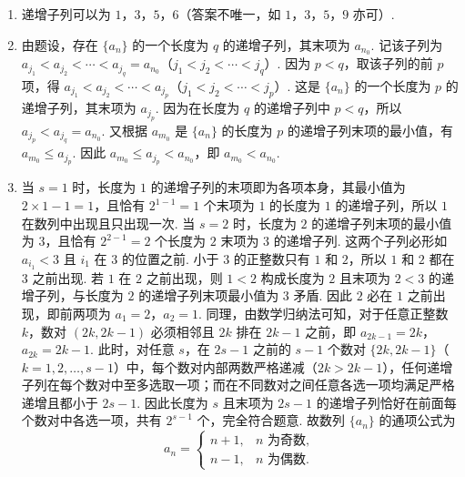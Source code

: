 \begin{solution}
\begin{enumerate}
\item 递增子列可以为 \(1\)，\(3\)，\(5\)，\(6\)（答案不唯一，如 \(1\)，\(3\)，\(5\)，\(9\) 亦可）.

\item 由题设，存在 \(\{a_n\}\) 的一个长度为 \(q\) 的递增子列，其末项为 \(a_{n_0}\).
记该子列为 \(a_{j_1}<a_{j_2}<\cdots<a_{j_q}=a_{n_0}\)（\(j_1<j_2<\cdots<j_q\)）.
因为 \(p<q\)，取该子列的前 \(p\) 项，得 \(a_{j_1}<a_{j_2}<\cdots<a_{j_p}\)（\(j_1<j_2<\cdots<j_p\)）.
这是 \(\{a_n\}\) 的一个长度为 \(p\) 的递增子列，其末项为 \(a_{j_p}\).
因为在长度为 \(q\) 的递增子列中 \(p<q\)，所以 \(a_{j_p}<a_{j_q}=a_{n_0}\).
又根据 \(a_{m_0}\) 是 \(\{a_n\}\) 的长度为 \(p\) 的递增子列末项的最小值，有 \(a_{m_0}\le a_{j_p}\).
因此 \(a_{m_0}\le a_{j_p}<a_{n_0}\)，即 \(a_{m_0}<a_{n_0}\).

\item 当 \(s=1\) 时，长度为 \(1\) 的递增子列的末项即为各项本身，其最小值为 \(2\times1-1=1\)，且恰有 \(2^{1-1}=1\) 个末项为 \(1\) 的长度为 \(1\) 的递增子列，所以 \(1\) 在数列中出现且只出现一次.
当 \(s=2\) 时，长度为 \(2\) 的递增子列末项的最小值为 \(3\)，且恰有 \(2^{2-1}=2\) 个长度为 \(2\) 末项为 \(3\) 的递增子列.
这两个子列必形如 \(a_{i_1}<3\) 且 \(i_1\) 在 \(3\) 的位置之前. 小于 \(3\) 的正整数只有 \(1\) 和 \(2\)，所以 \(1\) 和 \(2\) 都在 \(3\) 之前出现.
若 \(1\) 在 \(2\) 之前出现，则 \(1<2\) 构成长度为 \(2\) 且末项为 \(2<3\) 的递增子列，与长度为 \(2\) 的递增子列末项最小值为 \(3\) 矛盾.
因此 \(2\) 必在 \(1\) 之前出现，即前两项为 \(a_1=2\)，\(a_2=1\).
同理，由数学归纳法可知，对于任意正整数 \(k\)，数对 \((2k,2k-1)\) 必须相邻且 \(2k\) 排在 \(2k-1\) 之前，即 \(a_{2k-1}=2k\)，\(a_{2k}=2k-1\).
此时，对任意 \(s\)，在 \(2s-1\) 之前的 \(s-1\) 个数对 \(\{2k,2k-1\}\)（\(k=1,2,\dots,s-1\)）中，每个数对内部两数严格递减（\(2k>2k-1\)），任何递增子列在每个数对中至多选取一项；而在不同数对之间任意各选一项均满足严格递增且都小于 \(2s-1\).
因此长度为 \(s\) 且末项为 \(2s-1\) 的递增子列恰好在前面每个数对中各选一项，共有 \(2^{s-1}\) 个，完全符合题意.
故数列 \(\{a_n\}\) 的通项公式为
\[
a_n=\begin{cases}
n+1,&n\text{ 为奇数},\\
n-1,&n\text{ 为偶数}.
\end{cases}
\]
\end{enumerate}
\end{solution}

